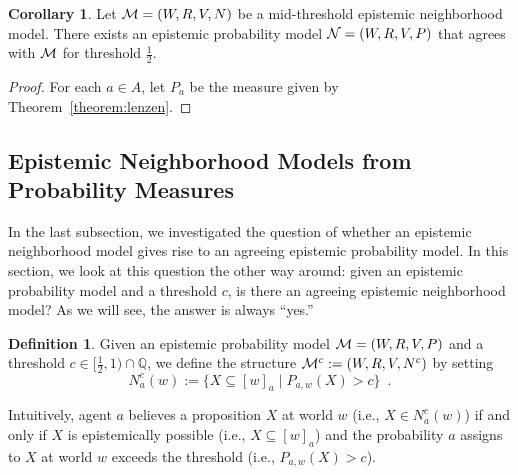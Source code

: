 \documentclass[12pt]{article}
\theoremstyle{definition}
\newtheorem{corollary}[theorem]{Corollary}
\newtheorem{definition}[theorem]{Definition}
\newcommand{\Rat}{\mathbb{Q}}  %
\newcommand{\M}{{\cal M}}      %
\newcommand{\N}{{\cal N}}      %
\begin{document}
\begin{corollary}
  \label{corollary:lenzen}
  Let $\M=(W,R,V,N)$ be a mid-threshold epistemic neighborhood model.
  There exists an epistemic probability model $\N=(W,R,V,P)$ that
  agrees with $\M$ for threshold $\frac 12$.
\end{corollary}
\begin{proof} 
  For each $a\in A$, let $P_a$ be the measure given by
  Theorem~\ref{theorem:lenzen}.
\end{proof}

\subsection{Epistemic Neighborhood Models from Probability Measures}
\label{Section:BeliefBet}

In the last subsection, we investigated the question of whether an
epistemic neighborhood model gives rise to an agreeing epistemic
probability model.  In this section, we look at this question the
other way around: given an epistemic probability model and a threshold
$c$, is there an agreeing epistemic neighborhood model?  As we will
see, the answer is always ``yes.''

\begin{definition}
  Given an epistemic probability model $\M = (W,R,V,P)$ and a
  threshold $c\in[\frac 12,1)\cap\Rat$, we define the structure $\M^c
  := (W,R,V,N^c)$ by setting
  \[
  N^c_a(w) := \{X\subseteq[w]_a\mid P_{a,w}(X)>c\}\enspace.
  \]
\end{definition}

Intuitively, agent $a$ believes a proposition $X$ at world $w$ (i.e.,
$X\in N^c_a(w)$) if and only if $X$ is epistemically possible (i.e.,
$X\subseteq[w]_a$) and the probability $a$ assigns to $X$ at world $w$
exceeds the threshold (i.e., $P_{a,w}(X)>c$).
\end{document}

